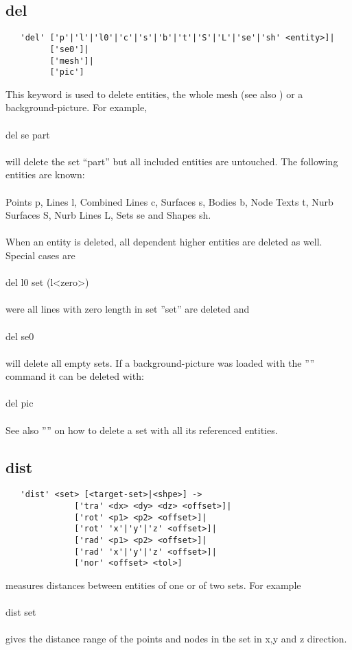 \documentclass{article}
\begin{document}
\subsection{\label{del}del}
\begin{verbatim}
   'del' ['p'|'l'|'l0'|'c'|'s'|'b'|'t'|'S'|'L'|'se'|'sh' <entity>]|
         ['se0']|
         ['mesh']|
         ['pic'] 
\end{verbatim}
This keyword is used to delete entities, the whole mesh (see also ) or a background-picture. For example,\\\\
del se part\\\\
will delete the set ``part'' but all included entities are untouched. The following entities are known:\\\\
Points p, Lines l, Combined Lines c, Surfaces s, Bodies b, Node Texts t, Nurb Surfaces S, Nurb Lines L, Sets se and Shapes sh.\\\\
When an entity is deleted, all dependent higher entities are deleted as well. Special cases are\\\\del l0 set  (l<zero>)\\\\were all lines with zero length in set ''set'' are deleted and\\\\del se0\\\\will delete all empty sets.
If a background-picture was loaded with the '''' command it can be deleted with:\\\\
del pic
\\\\See also '''' on how to delete a set with all its referenced entities.

\subsection{\label{dist}dist}
\begin{verbatim}
   'dist' <set> [<target-set>|<shpe>] ->
              ['tra' <dx> <dy> <dz> <offset>]|
              ['rot' <p1> <p2> <offset>]|
              ['rot' 'x'|'y'|'z' <offset>]|
              ['rad' <p1> <p2> <offset>]|
              ['rad' 'x'|'y'|'z' <offset>]|
              ['nor' <offset> <tol>]   
\end{verbatim}
measures distances between entities of one or of two sets. For example \\\\
dist set \\\\
gives the distance range of the points and nodes in the set in x,y and z direction.
\end{document}
